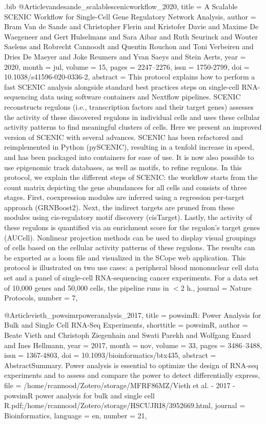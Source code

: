 \documentclass[
  table,
  10pt,
  a4paper]{article}
\begin{document}
\begin{filecontents}{\jobname.bib}
@Article{vandesande_scalablescenicworkflow_2020,
	title = {A Scalable {{SCENIC}} Workflow for Single-Cell Gene Regulatory Network Analysis},
	author = {Bram {Van de Sande} and Christopher Flerin and Kristofer Davie and Maxime {De Waegeneer} and Gert Hulselmans and Sara Aibar and Ruth Seurinck and Wouter Saelens and Robrecht Cannoodt and Quentin Rouchon and Toni Verbeiren and Dries {De Maeyer} and Joke Reumers and Yvan Saeys and Stein Aerts},
	year = {2020},
	month = {jul},
	volume = {15},
	pages = {2247--2276},
	issn = {1750-2799},
	doi = {10.1038/s41596-020-0336-2},
	abstract = {This protocol explains how to perform a fast SCENIC analysis alongside standard best practices steps on single-cell RNA-sequencing data using software containers and Nextflow pipelines. SCENIC reconstructs regulons (i.e., transcription factors and their target genes) assesses the activity of these discovered regulons in individual cells and uses these cellular activity patterns to find meaningful clusters of cells. Here we present an improved version of SCENIC with several advances. SCENIC has been refactored and reimplemented in Python (pySCENIC), resulting in a tenfold increase in speed, and has been packaged into containers for ease of use. It is now also possible to use epigenomic track databases, as well as motifs, to refine regulons. In this protocol, we explain the different steps of SCENIC: the workflow starts from the count matrix depicting the gene abundances for all cells and consists of three stages. First, coexpression modules are inferred using a regression per-target approach (GRNBoost2). Next, the indirect targets are pruned from these modules using cis-regulatory motif discovery (cisTarget). Lastly, the activity of these regulons is quantified via an enrichment score for the regulon's target genes (AUCell). Nonlinear projection methods can be used to display visual groupings of cells based on the cellular activity patterns of these regulons. The results can be exported as a loom file and visualized in the SCope web application. This protocol is illustrated on two use cases: a peripheral blood mononuclear cell data set and a panel of single-cell RNA-sequencing cancer experiments. For a data set of 10,000 genes and 50,000 cells, the pipeline runs in {$<$}2 h.},
	journal = {Nature Protocols},
	number = {7},
}

@Article{vieth_powsimrpoweranalysis_2017,
	title = {{{powsimR}}: Power Analysis for Bulk and Single Cell {{RNA}}-Seq Experiments},
	shorttitle = {{{powsimR}}},
	author = {Beate Vieth and Christoph Ziegenhain and Swati Parekh and Wolfgang Enard and Ines Hellmann},
	year = {2017},
	month = {nov},
	volume = {33},
	pages = {3486--3488},
	issn = {1367-4803},
	doi = {10.1093/bioinformatics/btx435},
	abstract = {AbstractSummary.  Power analysis is essential to optimize the design of RNA-seq experiments and to assess and compare the power to detect differentially express},
	file = {/home/rcannood/Zotero/storage/MFRF86MZ/Vieth et al. - 2017 - powsimR power analysis for bulk and single cell R.pdf;/home/rcannood/Zotero/storage/HSCUJRI8/3952669.html},
	journal = {Bioinformatics},
	language = {en},
	number = {21},
}


\end{filecontents}
\end{document}
